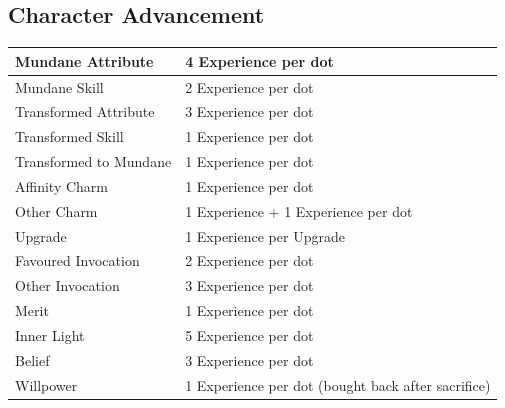 

\subsection*{Character Advancement}

 \begin{table}[H]
    \begin{tabular}{|l|l|}
        \hline
        Mundane Attribute       & 4 Experience per dot                                \\ \hline
        Mundane Skill           & 2 Experience per dot                                \\ \hline
        Transformed Attribute   & 3 Experience per dot                                \\ \hline
        Transformed Skill       & 1 Experience per dot                                \\ \hline
        Transformed to Mundane  & 1 Experience per dot  \\ \hline
        Affinity Charm          & 1 Experience per dot                                            \\ \hline
        Other Charm             & 1 Experience + 1 Experience per dot                                           \\ \hline
        Upgrade          	 & 1 Experience per Upgrade                                                   \\ \hline
        Favoured Invocation     & 2 Experience per dot                                        \\ \hline
        Other Invocation        & 3 Experience per dot                                        \\ \hline
        Merit                   & 1 Experience per dot                                        \\ \hline
        Inner Light             & 5 Experience per dot                                       \\ \hline
        Belief                  & 3 Experience per dot                                    \\ \hline
        Willpower               & 1 Experience per dot (bought back after sacrifice)                     \\
        \hline
    \end{tabular}
\end{table}

